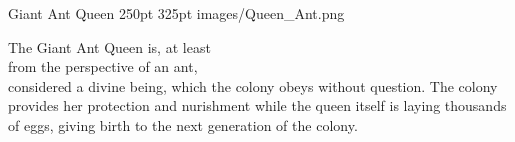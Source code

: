 \documentclass[letterpaper,openany,twoside,twocolumn]{book}
\begin{document}

\MonsterBannerGraphic%
	{Giant Ant Queen}%
	{250pt}%
	{325pt}%
	{images/Queen_Ant.png}%
	{}%
	
\noindent The Giant Ant Queen is, at least\\
from the perspective of an ant,\\
considered a divine being, which the colony obeys without question. The colony provides her protection and nurishment while the queen itself is laying thousands of eggs, giving birth to the next generation of the colony.
\end{document}
